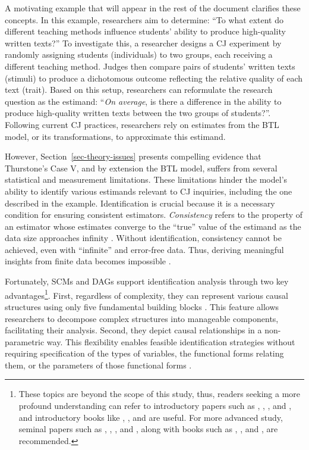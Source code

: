 \documentclass[
  authoryear,
  review,
  1p]{elsarticle}
\begin{document}
A motivating example that will appear in the rest of the document
clarifies these concepts. In this example, researchers aim to determine:
``To what extent do different teaching methods influence students'
ability to produce high-quality written texts?'' To investigate this, a
researcher designs a CJ experiment by randomly assigning students
(individuals) to two groups, each receiving a different teaching method.
Judges then compare pairs of students' written texts (stimuli) to
produce a dichotomous outcome reflecting the relative quality of each
text (trait). Based on this setup, researchers can reformulate the
research question as the estimand: ``\emph{On average}, is there a
difference in the ability to produce high-quality written texts between
the two groups of students?''. Following current CJ practices,
researchers rely on estimates from the BTL model, or its
transformations, to approximate this estimand.

However, Section~\ref{sec-theory-issues} presents compelling evidence
that Thurstone's Case V, and by extension the BTL model, suffers from
several statistical and measurement limitations. These limitations
hinder the model's ability to identify various estimands relevant to CJ
inquiries, including the one described in the example. Identification is
crucial because it is a necessary condition for ensuring consistent
estimators. \emph{Consistency} refers to the property of an estimator
whose estimates converge to the ``true'' value of the estimand as the
data size approaches infinity \citep{Everitt_et_al_2010}. Without
identification, consistency cannot be achieved, even with ``infinite''
and error-free data. Thus, deriving meaningful insights from finite data
becomes impossible \citep{Schuessler_et_al_2023}.

Fortunately, SCMs and DAGs support identification analysis through two
key advantages\footnote{These topics are beyond the scope of this study,
  thus, readers seeking a more profound understanding can refer to
  introductory papers such as \citet{Pearl_2010}, \citet{Rohrer_2018},
  \citet{Pearl_2019}, and \citet{Cinelli_et_al_2020}, and introductory
  books like \citet{Pearl_et_al_2018}, \citet{Neal_2020}, and
  \citet{McElreath_2020} are useful. For more advanced study, seminal
  papers such as \citet{Neyman_et_al_1923}, \citet{Rubin_1974},
  \citet{Spirtes_et_al_1991}, and \citet{Sekhon_2009}, along with books
  such as \citet{Pearl_2009}, \citet{Morgan_et_al_2014}, and
  \citet{Hernan_et_al_2020}, are recommended.}. First, regardless of
complexity, they can represent various causal structures using only five
fundamental building blocks \citep{Neal_2020, McElreath_2024}. This
feature allows researchers to decompose complex structures into
manageable components, facilitating their analysis. Second, they depict
causal relationships in a non-parametric way. This flexibility enables
feasible identification strategies without requiring specification of
the types of variables, the functional forms relating them, or the
parameters of those functional forms \citep{Pearl_et_al_2016}.
\end{document}
